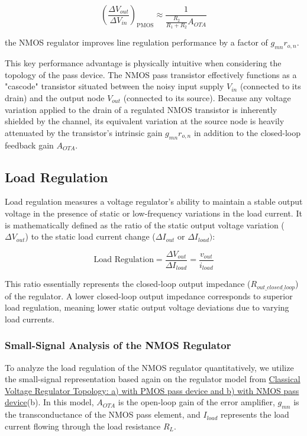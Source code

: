 \documentclass[
]{article}
\begin{document}
\[\left(\frac{\Delta V_{out}}{\Delta V_{in}}\right)_{\text{PMOS}} \approx \frac{1}{\frac{R_2}{R_1 + R_2} A_{OTA}}\]

the NMOS regulator improves line regulation performance by a factor of
\(g_{mn} r_{o,n}\).

This key performance advantage is physically intuitive when considering
the topology of the pass device. The NMOS pass transistor effectively
functions as a "cascode" transistor situated between the noisy input
supply \(V_{in}\) (connected to its drain) and the output node
\(V_{out}\) (connected to its source). Because any voltage variation
applied to the drain of a regulated NMOS transistor is inherently
shielded by the channel, its equivalent variation at the source node is
heavily attenuated by the transistor's intrinsic gain \(g_{mn} r_{o,n}\)
in addition to the closed-loop feedback gain \(A_{OTA}\).

\subsection{Load Regulation}\label{_load_regulation}

Load regulation measures a voltage regulator's ability to maintain a
stable output voltage in the presence of static or low-frequency
variations in the load current. It is mathematically defined as the
ratio of the static output voltage variation (\(\Delta V_{out}\)) to the
static load current change (\(\Delta I_{out}\) or \(\Delta I_{load})\):

\[\text{Load Regulation} = \frac{\Delta V_{out}}{\Delta I_{load}} = \frac{v_{out}}{i_{load}}\]

This ratio essentially represents the closed-loop output impedance
(\(R_{out\_closed\_loop}\)) of the regulator. A lower closed-loop output
impedance corresponds to superior load regulation, meaning lower static
output voltage deviations due to varying load currents.

\subsubsection{Small-Signal Analysis of the NMOS
Regulator}\label{_small_signal_analysis_of_the_nmos_regulator}

To analyze the load regulation of the NMOS regulator quantitatively, we
utilize the small-signal representation based again on the regulator
model from
\hyperref[classical_voltage_reg_topologies_nmos_and_pmos_pass_devices]{Classical
Voltage Regulator Topology: a) with PMOS pass device and b) with NMOS
pass device}(b). In this model, \(A_{OTA}\) is the open-loop gain of the
error amplifier, \(g_{mn}\) is the transconductance of the NMOS pass
element, and \(I_{load}\) represents the load current flowing through
the load resistance \(R_L\).
\end{document}
